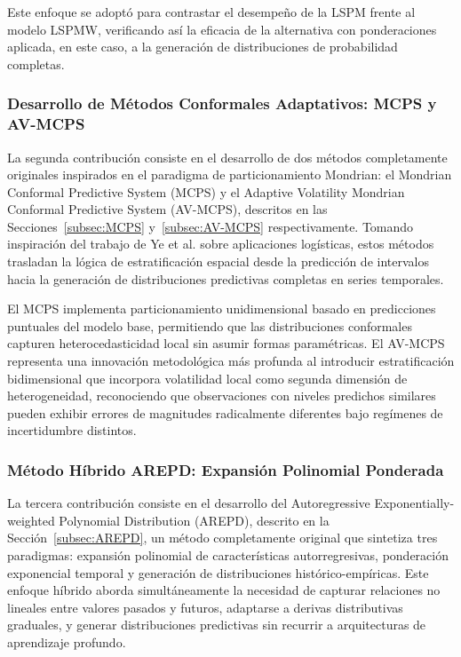 Este enfoque se adoptó para contrastar el desempeño de la LSPM frente al modelo LSPMW, verificando así la eficacia de la alternativa con ponderaciones aplicada, en este caso, a la generación de distribuciones de probabilidad completas.


\subsubsection{Desarrollo de Métodos Conformales Adaptativos: MCPS y AV-MCPS}

La segunda contribución consiste en el desarrollo de dos métodos completamente originales inspirados en el paradigma de particionamiento Mondrian: el Mondrian Conformal Predictive System (MCPS) y el Adaptive Volatility Mondrian Conformal Predictive System (AV-MCPS), descritos en las Secciones~\ref{subsec:MCPS} y~\ref{subsec:AV-MCPS} respectivamente. Tomando inspiración del trabajo de Ye et al. sobre aplicaciones logísticas, estos métodos trasladan la lógica de estratificación espacial desde la predicción de intervalos hacia la generación de distribuciones predictivas completas en series temporales.

El MCPS implementa particionamiento unidimensional basado en predicciones puntuales del modelo base, permitiendo que las distribuciones conformales capturen heterocedasticidad local sin asumir formas paramétricas. El AV-MCPS representa una innovación metodológica más profunda al introducir estratificación bidimensional que incorpora volatilidad local como segunda dimensión de heterogeneidad, reconociendo que observaciones con niveles predichos similares pueden exhibir errores de magnitudes radicalmente diferentes bajo regímenes de incertidumbre distintos.


\subsubsection{Método Híbrido AREPD: Expansión Polinomial Ponderada}

La tercera contribución consiste en el desarrollo del Autoregressive Exponentially-weighted Polynomial Distribution (AREPD), descrito en la Sección~\ref{subsec:AREPD}, un método completamente original que sintetiza tres paradigmas: expansión polinomial de características autorregresivas, ponderación exponencial temporal y generación de distribuciones histórico-empíricas. Este enfoque híbrido aborda simultáneamente la necesidad de capturar relaciones no lineales entre valores pasados y futuros, adaptarse a derivas distributivas graduales, y generar distribuciones predictivas sin recurrir a arquitecturas de aprendizaje profundo.

